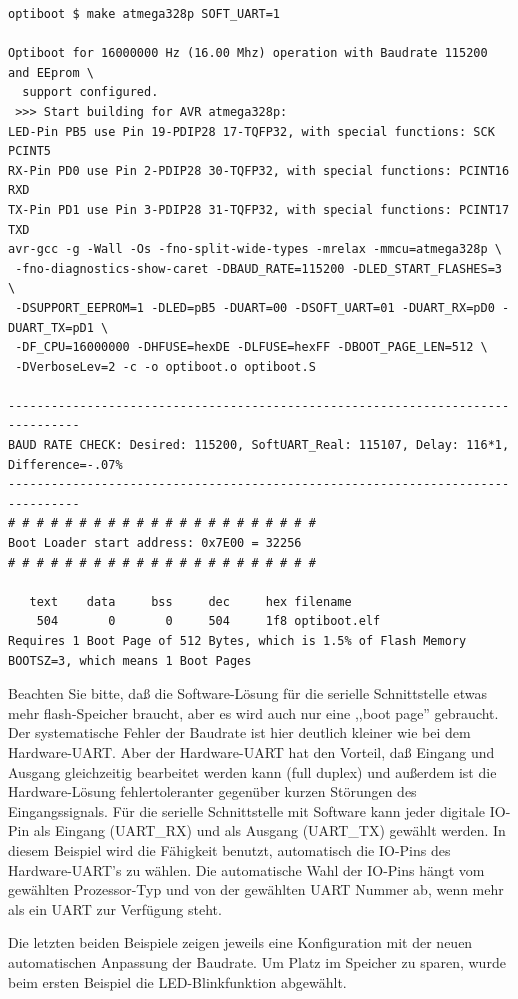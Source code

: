 \begin{verbatim}
optiboot $ make atmega328p SOFT_UART=1

Optiboot for 16000000 Hz (16.00 Mhz) operation with Baudrate 115200 and EEprom \
  support configured.
 >>> Start building for AVR atmega328p:
LED-Pin PB5 use Pin 19-PDIP28 17-TQFP32, with special functions: SCK PCINT5
RX-Pin PD0 use Pin 2-PDIP28 30-TQFP32, with special functions: PCINT16 RXD
TX-Pin PD1 use Pin 3-PDIP28 31-TQFP32, with special functions: PCINT17 TXD
avr-gcc -g -Wall -Os -fno-split-wide-types -mrelax -mmcu=atmega328p \
 -fno-diagnostics-show-caret -DBAUD_RATE=115200 -DLED_START_FLASHES=3 \
 -DSUPPORT_EEPROM=1 -DLED=pB5 -DUART=00 -DSOFT_UART=01 -DUART_RX=pD0 -DUART_TX=pD1 \
 -DF_CPU=16000000 -DHFUSE=hexDE -DLFUSE=hexFF -DBOOT_PAGE_LEN=512 \
 -DVerboseLev=2 -c -o optiboot.o optiboot.S

--------------------------------------------------------------------------------
BAUD RATE CHECK: Desired: 115200, SoftUART_Real: 115107, Delay: 116*1, Difference=-.07%
--------------------------------------------------------------------------------
# # # # # # # # # # # # # # # # # # # # # #
Boot Loader start address: 0x7E00 = 32256
# # # # # # # # # # # # # # # # # # # # # #

   text	   data	    bss	    dec	    hex	filename
    504	      0	      0	    504	    1f8	optiboot.elf
Requires 1 Boot Page of 512 Bytes, which is 1.5% of Flash Memory
BOOTSZ=3, which means 1 Boot Pages

\end{verbatim}

Beachten Sie bitte, daß die Software-Lösung für die serielle Schnittstelle etwas mehr flash-Speicher braucht,
aber es wird auch nur eine ,,boot page'' gebraucht. Der systematische Fehler der Baudrate ist hier deutlich kleiner
wie bei dem Hardware-UART.
Aber der Hardware-UART hat den Vorteil, daß Eingang und Ausgang gleichzeitig bearbeitet werden kann (full duplex) und 
außerdem ist die Hardware-Lösung fehlertoleranter gegenüber kurzen Störungen des Eingangssignals.
Für die serielle Schnittstelle mit Software kann jeder digitale IO-Pin als Eingang (UART\_RX) und als Ausgang (UART\_TX)
gewählt werden. In diesem Beispiel wird die Fähigkeit benutzt, automatisch die IO-Pins des Hardware-UART's zu wählen.
Die automatische Wahl der IO-Pins hängt vom gewählten Prozessor-Typ und von der gewählten UART Nummer ab,
wenn mehr als ein UART zur Verfügung steht.

Die letzten beiden Beispiele zeigen jeweils eine Konfiguration mit der neuen automatischen Anpassung der Baudrate.
Um Platz im Speicher zu sparen, wurde beim ersten Beispiel die LED-Blinkfunktion abgewählt.

